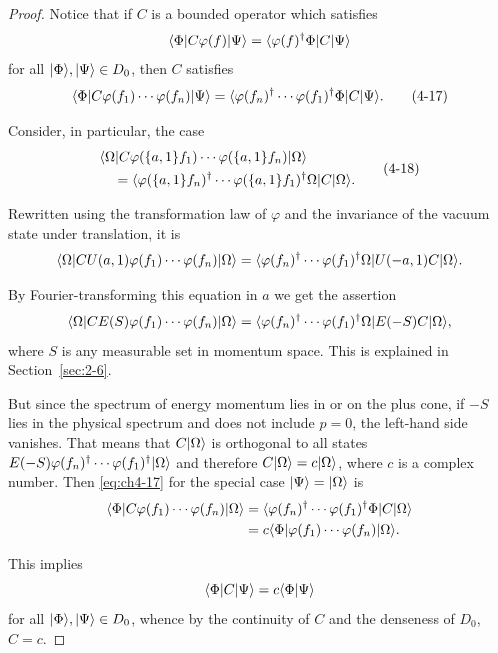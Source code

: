 \begin{proof}
Notice that if $C$ is a bounded operator which satisfies
\begin{equation*}
  \langle \Phi\vert C\varphi(f)\vert \Psi\rangle
  =\langle \varphi(f)^\dagger\Phi\vert C\vert \Psi\rangle
\end{equation*}
for all $\lvert \Phi\rangle,\lvert \Psi\rangle\in D_0$, then $C$ satisfies
\begin{equation}
  \langle \Phi\vert C\varphi(f_1)\cdots\varphi(f_n)\vert \Psi\rangle
  =\langle \varphi(f_n)^\dagger\cdots\varphi(f_1)^\dagger\Phi\vert C\vert \Psi\rangle.
  \tag{4-17}\label{eq:ch4-17}
\end{equation}

Consider, in particular, the case
\begin{equation}
\begin{aligned}
  &\langle \Omega\rvert C\varphi(\{a,1\}f_1)\cdots
  \varphi(\{a,1\}f_n)\lvert \Omega\rangle \\
  &\quad=\langle \varphi(\{a,1\}f_n)^\dagger\cdots
  \varphi(\{a,1\}f_1)^\dagger\Omega\rvert C\lvert \Omega\rangle.
\end{aligned}
\tag{4-18}\label{eq:ch4-18}
\end{equation}

Rewritten using the transformation law of $\varphi$ and the invariance of the
vacuum state under translation, it is
\begin{equation*}
  \langle \Omega\rvert CU(a,1)\varphi(f_1)\cdots\varphi(f_n)\lvert \Omega\rangle
  =\langle \varphi(f_n)^\dagger\cdots\varphi(f_1)^\dagger\Omega\rvert
  U(-a,1)C\lvert \Omega\rangle.
\end{equation*}

By Fourier-transforming this equation in $a$ we get the assertion
\begin{equation*}
  \langle \Omega\rvert CE(S)\varphi(f_1)\cdots\varphi(f_n)\lvert \Omega\rangle
  =\langle \varphi(f_n)^\dagger\cdots\varphi(f_1)^\dagger\Omega\rvert
  E(-S)C\lvert \Omega\rangle,
\end{equation*}
where $S$ is any measurable set in momentum space. This is explained in
Section~\ref{sec:2-6}.

But since the spectrum of energy momentum lies in or on the plus cone, if
$-S$ lies in the physical spectrum and does not include $p=0$, the left-hand
side vanishes. That means that $C\lvert \Omega\rangle$ is orthogonal to all states
$E(-S)\varphi(f_n)^\dagger\cdots\varphi(f_1)^\dagger\lvert \Omega\rangle$ and therefore
$C\lvert \Omega\rangle=c\lvert \Omega\rangle$, where $c$ is a complex number. Then \eqref{eq:ch4-17} for
the special case $\lvert \Psi\rangle=\lvert \Omega\rangle$ is
\begin{equation*}
\begin{aligned}
  \langle \Phi\vert C\varphi(f_1)\cdots\varphi(f_n)\vert \Omega\rangle
  &=\langle \varphi(f_n)^\dagger\cdots\varphi(f_1)^\dagger\Phi\vert C\vert \Omega\rangle \\
  &=c\langle \Phi\vert \varphi(f_1)\cdots\varphi(f_n)\vert \Omega\rangle.
\end{aligned}
\end{equation*}

This implies
\begin{equation*}
  \langle \Phi\rvert C\lvert \Psi\rangle=c\langle \Phi\vert \Psi\rangle
\end{equation*}
for all $\lvert \Phi\rangle,\lvert \Psi\rangle\in D_0$, whence by the continuity of $C$ and
the denseness of $D_0$, $C=c$.
\end{proof}
